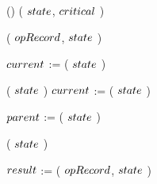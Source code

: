 \begin{limitscope}
\begin{algorithm}[tb]
{{{{				 }
				 \label{lin:local-test|safety:while:consistent:end}
				
			}
			\Else()
			{
			    \label{lin:local-test|safety:while:nonconsistent:begin}
			    \RemoveUntilCritical( $state$, $critical$ )\;
					\Return \False\;
					\label{lin:local-test|safety:while:nonconsistent:end}
			}
				
			
			\label{lin:local-test|safety:while:end} 
	 }
	 
	 \OptReturn[\False]
	 \label{lin:local-test|safety:end}
	  
}
\BlankLine
\DontPrintSemicolon
\Boolean \FindStartPoint( $\opRecord$, $state$ )\;
\PrintSemicolon
\label{lin:local-find|start|point:begin}
\Begin
{
   
	 \While{\True}
   {
	    \label{lin:local-find|start|point:while:begin}
			$\cNode$ := \GetTop( $state$ )\;
			\label{lin:local-find|start|point:while:backtrack:begin}
    		
	    \While{\IsMarked( $\cNode$ )}
			{
			  
			   \RemoveFromTop( $state$ )\;
				 $\cNode$ := \GetTop( $state$ )\;
         
			}
			
			\BlankLine

			\If{\NeedCleanParentNode( $\opRecord$, $\cNode$ )}
			{ 
			   \label{lin:local-find|start|point:while:clean:begin}
				 $\pNode$ := \GetSecondToTop( $state$ )\; 
				 \If{\LNot(\IsClean( $\pNode$ ))}
				 {
						
											
				    \RemoveFromTop( $state$ )\;
						\Continue\;
						\label{lin:local-find|start|point:while:clean:end}
						\label{lin:local-find|start|point:while:backtrack:end}
				 }
			}
			
			
			\BlankLine
			
		
	    $\result$ := \FindAdmissible( $\opRecord$, $state$ )\;
	    \label{lin:local-find|start|point:while:test|safety}
			
			\lIf{$\result$}
			{
			   \Return \True
			}
			   
}}
\end{algorithm}
\end{limitscope}
